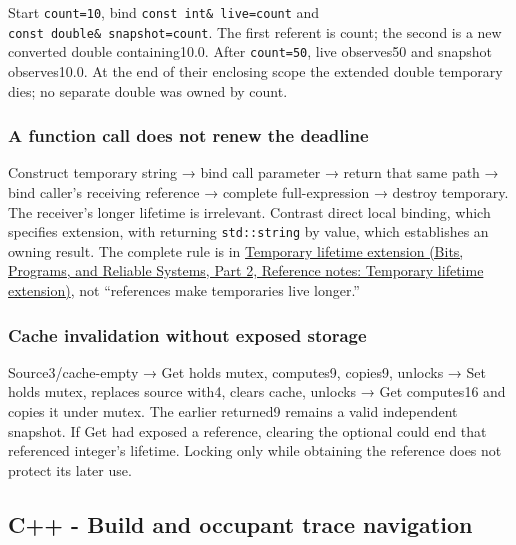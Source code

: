 \hypertarget{appendix-92ff77d4dfdc-direct-alias-versus-converted-snapshot}{}

Start \texttt{count=10}, bind \texttt{const\ int\&\ live=count} and \texttt{const\ double\&\ snapshot=count}. The first referent is count; the second is a new converted double containing10.0. After \texttt{count=50}, live observes50 and snapshot observes10.0. At the end of their enclosing scope the extended double temporary dies; no separate double was owned by count.

\subsubsection{A function call does not renew the deadline}\label{appendix-92ff77d4dfdc-a-function-call-does-not-renew-the-deadline}

\hypertarget{appendix-92ff77d4dfdc-a-function-call-does-not-renew-the-deadline}{}

Construct temporary string → bind call parameter → return that same path → bind caller's receiving reference → complete full-expression → destroy temporary. The receiver's longer lifetime is irrelevant. Contrast direct local binding, which specifies extension, with returning \texttt{std::string} by value, which establishes an owning result. The complete rule is in \href{../01-Bits-Programs-and-Reliable-Systems-P02/main.pdf\#nameddest=appendix-a978b29bbbb0}{Temporary lifetime extension (Bits, Programs, and Reliable Systems, Part 2, Reference notes: Temporary lifetime extension)}, not ``references make temporaries live longer.''

\subsubsection{Cache invalidation without exposed storage}\label{appendix-92ff77d4dfdc-cache-invalidation-without-exposed-storage}

\hypertarget{appendix-92ff77d4dfdc-cache-invalidation-without-exposed-storage}{}

Source3/cache-empty → Get holds mutex, computes9, copies9, unlocks → Set holds mutex, replaces source with4, clears cache, unlocks → Get computes16 and copies it under mutex. The earlier returned9 remains a valid independent snapshot. If Get had exposed a reference, clearing the optional could end that referenced integer's lifetime. Locking only while obtaining the reference does not protect its later use.

\subsection{C++ - Build and occupant trace navigation}\label{appendix-92ff77d4dfdc-c---build-and-occupant-trace-navigation}

